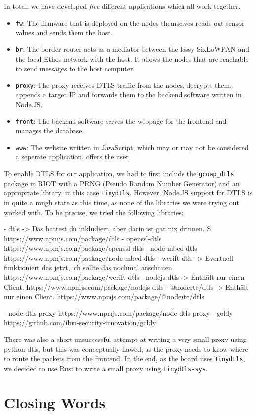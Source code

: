 \documentclass[10pt, a4paper]{article}
\begin{document}
    In total, we have developed \emph{five} different applications which all work together.
    \begin{itemize}
        \item \texttt{fw}: The firmware that is deployed on the nodes themselves reads out sensor values and sends them the host.
        \item \texttt{br}: The border router acts as a mediator between the lossy SixLoWPAN and the local Ethos network with the host. It allows the nodes that are reachable to send messages to the host computer.
        \item \texttt{proxy}: The proxy receives DTLS traffic from the nodes, decrypts them, appends a target IP and forwards them to the backend software written in Node.JS.
        \item \texttt{front}: The backend software serves the webpage for the frontend and manages the database.
        \item \texttt{www}: The website written in JavaScript, which may or may not be considered a seperate application, offers the user
    \end{itemize}

    To enable DTLS for our application, we had to first include the \texttt{gcoap\_dtls} package in RIOT with a PRNG (Pseudo Random Number Generator) and an appropriate library, in this case \texttt{tinydtls}. However, Node.JS support for DTLS is in quite a rough state as this time, as none of the libraries we were trying out worked with. To be precise, we tried the following libraries:

    - dtls -> Das hattest du inkludiert, aber darin ist gar nix drinnen. S. https://www.npmjs.com/package/dtls
- openssl-dtls https://www.npmjs.com/package/openssl-dtls
- node-mbed-dtls https://www.npmjs.com/package/node-mbed-dtls
- werift-dtls -> Eventuell funktioniert das jetzt, ich sollte das nochmal anschauen https://www.npmjs.com/package/werift-dtls
- nodejs-dtls -> Enthält nur einen Client. https://www.npmjs.com/package/nodejs-dtls
- @nodertc/dtls -> Enthält nur einen Client. https://www.npmjs.com/package/@nodertc/dtls

    - node-dtls-proxy https://www.npmjs.com/package/node-dtls-proxy
- goldy https://github.com/ibm-security-innovation/goldy

    There was also a short unsuccessful attempt at writing a very small proxy using python-dtls, but this was conceptually flawed, as the proxy needs to know where to route the packets from the frontend. In the end, as the board uses \texttt{tinydtls}, we decided to use Rust to write a small proxy using \texttt{tinydtls-sys}.

    \section{Closing Words}

    \listoffigures
\end{document}
